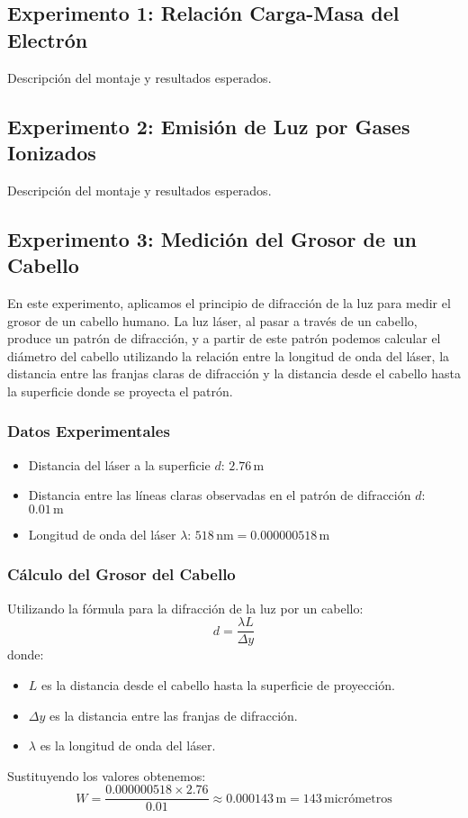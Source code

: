 \subsection{Experimento 1: Relación Carga-Masa del Electrón}
Descripción del montaje y resultados esperados.

\subsection{Experimento 2: Emisión de Luz por Gases Ionizados}
Descripción del montaje y resultados esperados.

\subsection{Experimento 3: Medición del Grosor de un Cabello}
En este experimento, aplicamos el principio de difracción de la luz para medir el grosor de un cabello humano. La luz láser, al pasar a través de un cabello, produce un patrón de difracción, y a partir de este patrón podemos calcular el diámetro del cabello utilizando la relación entre la longitud de onda del láser, la distancia entre las franjas claras de difracción y la distancia desde el cabello hasta la superficie donde se proyecta el patrón.

\subsubsection{Datos Experimentales}
\begin{itemize}
    \item Distancia del láser a la superficie \(d\): \(2.76 \, \text{m}\)
    \item Distancia entre las líneas claras observadas en el patrón de difracción \(d\): \(0.01 \, \text{m}\)
    \item Longitud de onda del láser \(\lambda\): \(518 \, \text{nm} = 0.000000518 \, \text{m}\)
\end{itemize}

\subsubsection{Cálculo del Grosor del Cabello}
Utilizando la fórmula para la difracción de la luz por un cabello:
\[
d = \frac{\lambda L}{\Delta y}
\]
donde:
\begin{itemize}
    \item \(L\) es la distancia desde el cabello hasta la superficie de proyección.
    \item \(\Delta y\) es la distancia entre las franjas de difracción.
    \item \(\lambda\) es la longitud de onda del láser.
\end{itemize}
Sustituyendo los valores obtenemos:
\[
W = \frac{0.000000518 \times 2.76}{0.01} \approx 0.000143 \, \text{m} = 143 \, \text{micrómetros}
\]

